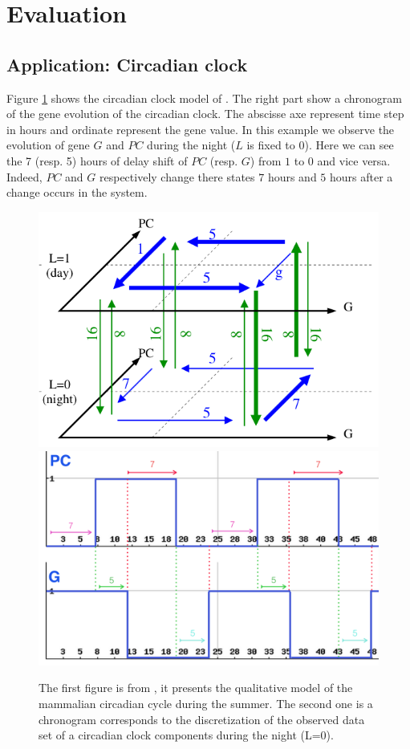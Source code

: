 \section{Evaluation}
\label{sec:evaluation}
\subsection{Application: Circadian clock}

Figure \ref{fig:circadian_clock} shows the circadian clock model of \cite{comet2012simplified}.
The right part show a chronogram of the gene evolution of the circadian clock.
The abscisse axe represent time step in hours and ordinate represent the gene value.
In this example we observe the evolution of gene $G$ and $PC$ during the night ($L$ is fixed to 0).
Here we can see the 7 (resp. 5) hours of delay shift of $PC$ (resp. $G$) from $1$ to $0$ and vice versa.
Indeed, $PC$ and $G$ respectively change there states $7$ hours and $5$ hours after a change occurs in the system.

\begin{figure}[htb!]
\begin{center}
\includegraphics[width=0.4\linewidth]{images/circadianClock-summer.png}
\includegraphics[width=0.4\linewidth]{images/circadianClock-Courb.png}
\end{center}
\caption{The first figure is from \cite{comet2010formal}, it presents the qualitative model of the mammalian circadian cycle during the summer. The second one is a chronogram corresponds to the discretization of the observed data set of a circadian clock components during the night (L=0).}
\label{fig:circadian_clock}
\end{figure}


